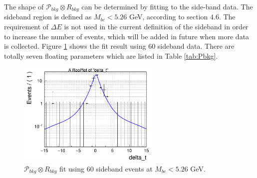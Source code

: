 The shape of $\mathcal{P}_{bkg}\otimes R_{bkg}$ can be determined by fitting to the side-band data. The sideband region is defined as $M_{bc}<5.26$ GeV, according to section 4.6. The requirement of $\Delta E$ is not used in the current definition of the sideband in order to increase the number of events, which will be added in future when more data is collected. Figure \ref{fig:Pbkg} shows the fit result using 60 sideband data. There are totally seven floating parameters which are listed in Table \ref{tab:Pbkg}.
\begin{figure}[htpb]
	\centering
	\includegraphics[height=5cm]{figures/bkg-cpfit-data-mbc526}
	\caption{$\mathcal{P}_{bkg}\otimes R_{bkg}$ fit  using 60 sideband events at $M_{bc} < 5.26$ GeV.}
	\label{fig:Pbkg}
\end{figure}


